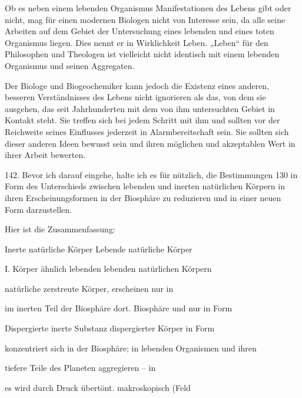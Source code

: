 \documentclass[11pt,a4paper]{book}
\begin{document}
Ob es neben einem lebenden Organismus Manifestationen des Lebens gibt oder nicht, mag für einen modernen Biologen nicht von Interesse sein, da alle seine Arbeiten auf dem Gebiet der Untersuchung eines lebenden und eines toten Organismus liegen. Dies nennt er in Wirklichkeit Leben. „Leben“ für den Philosophen und Theologen ist vielleicht nicht identisch mit einem lebenden Organismus und seinen Aggregaten.



Der Biologe und Biogeochemiker kann jedoch die Existenz eines anderen, besseren Verständnisses des Lebens nicht ignorieren als das, von dem sie ausgehen, das seit Jahrhunderten mit dem von ihm untersuchten Gebiet in Kontakt steht. Sie treffen sich bei jedem Schritt mit ihm und sollten vor der Reichweite seines Einflusses jederzeit in Alarmbereitschaft sein. Sie sollten sich dieser anderen Ideen bewusst sein und ihren möglichen und akzeptablen Wert in ihrer Arbeit bewerten.



142. Bevor ich darauf eingehe, halte ich es für nützlich, die Bestimmungen 130 in Form des Unterschieds zwischen lebenden und inerten natürlichen Körpern in ihren Erscheinungsformen in der Biosphäre zu reduzieren und in einer neuen Form darzustellen.



Hier ist die Zusammenfassung:



    Inerte natürliche Körper Lebende natürliche Körper      



 



I. Körper ähnlich lebenden lebenden natürlichen Körpern



natürliche zerstreute Körper, erscheinen nur in



im inerten Teil der Biosphäre dort. Biosphäre und nur in Form



Dispergierte inerte Substanz dispergierter Körper in Form



konzentriert sich in der Biosphäre; in lebenden Organismen und ihren



tiefere Teile des Planeten aggregieren -- in



es wird durch Druck übertönt. makroskopisch (Feld
\end{document}

